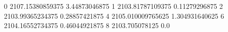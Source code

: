 0 2107.15380859375 3.44873046875
1 2103.81787109375 0.11279296875
2 2103.99365234375 0.28857421875
4 2105.010009765625 1.304931640625
6 2104.16552734375 0.46044921875
8 2103.705078125 0.0
